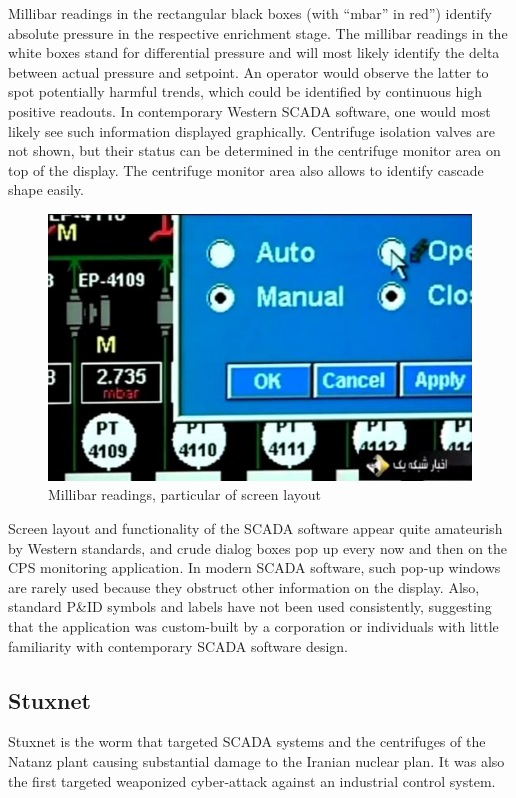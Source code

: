\documentclass[12pt]{article}
\begin{document}
Millibar readings in the rectangular black boxes (with “mbar” in red”) identify absolute pressure in the respective enrichment stage. The millibar readings in the white boxes stand for differential pressure and will most likely identify the delta between actual pressure and setpoint. An operator would observe the latter to spot potentially harmful trends, which could be identified by continuous high positive readouts. In contemporary Western SCADA software, one would most likely see such information displayed graphically. Centrifuge isolation valves are not shown, but their status can be determined in the centrifuge monitor area on top of the display. The centrifuge monitor area also allows to identify cascade shape easily. 

 \begin{figure}[H]
    \centering
    \includegraphics[height=0.6\textwidth]{scadaBlu.png}
    \caption{Millibar readings, particular of screen layout}
    \label{fig:scadaBlu}
    \end{figure}

Screen layout and functionality of the SCADA software appear quite amateurish by Western standards, and crude dialog boxes pop up every now and then on the CPS monitoring application. In modern SCADA software, such pop-up windows are rarely used because they obstruct other information on the display. Also, standard P\&ID symbols and labels have not been used consistently, suggesting that the application was custom-built by a corporation or individuals with little familiarity with contemporary SCADA software design. \cite{killcentrifuge}

\subsection{Stuxnet}
Stuxnet is the worm that targeted SCADA systems and the centrifuges of the Natanz plant causing substantial damage to the Iranian nuclear plan. It was also the first targeted weaponized cyber-attack against an industrial control system.
\end{document}
